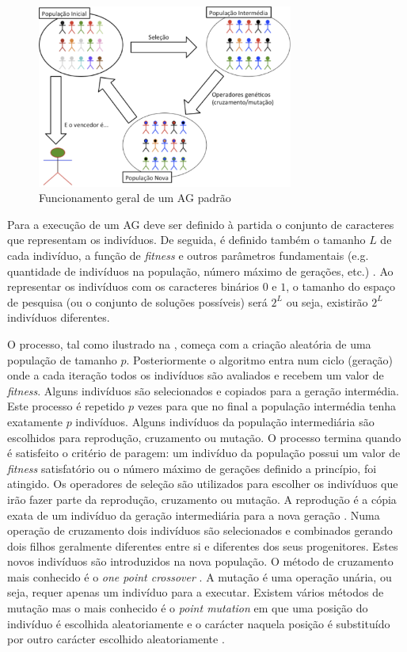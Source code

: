 \begin{figure}[H]
	\centering
	\includegraphics[width=0.75\textwidth]{figures/1}
	\caption{Funcionamento geral de um \ac{AG} padrão}
	\label{Figura111}
\end{figure}

Para a execução de um \ac{AG} deve ser definido à partida o conjunto de caracteres que representam os indivíduos. 
De seguida, é definido também o tamanho $L$ de cada indivíduo, a função de \emph{fitness} e outros parâmetros fundamentais
(e.g. quantidade de indivíduos na população, número máximo de gerações, etc.) \citep{Holland1975}. 
Ao representar os indivíduos com os caracteres binários $0$ e $1$, o tamanho do espaço de pesquisa (ou o conjunto de soluções
possíveis) será $2^L$ ou seja, existirão $2^L$ 
indivíduos diferentes.

O processo, tal como ilustrado na , começa com a criação aleatória de uma população de tamanho $p$. 
Posteriormente o algoritmo entra num ciclo (geração) onde a cada iteração todos os indivíduos são avaliados e recebem um valor de \emph{fitness}. 
Alguns indivíduos são selecionados e copiados para a geração intermédia. Este processo é repetido $p$ vezes para que no final a 
população intermédia tenha exatamente $p$ indivíduos. Alguns indivíduos da população intermediária são escolhidos para reprodução, 
cruzamento ou mutação. O processo termina quando é satisfeito o critério de paragem: um indivíduo da população possui um valor 
de \emph{fitness} satisfatório ou o número máximo de gerações definido a princípio, foi atingido. Os operadores de seleção são utilizados
para escolher os indivíduos que irão fazer parte da reprodução, cruzamento ou mutação. A reprodução é a cópia exata de um indivíduo 
da geração intermediária para a nova geração \citep{Holland1975}. Numa operação de cruzamento dois indivíduos são selecionados e 
combinados gerando dois filhos geralmente diferentes entre si e diferentes dos seus progenitores. Estes novos indivíduos são 
introduzidos na nova população. O método de cruzamento mais conhecido é o \emph{one point crossover} \citep{Holland1975}.
A mutação é uma operação unária, ou seja, requer apenas um indivíduo para a executar. Existem vários métodos de mutação 
mas o mais conhecido é o \emph{point mutation} em que uma posição do indivíduo é escolhida aleatoriamente e o carácter naquela posição 
é substituído por outro carácter escolhido aleatoriamente \citep{Holland1975}.

